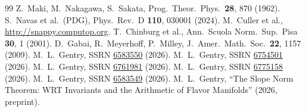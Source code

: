 \documentclass[11pt,a4paper]{article}
\theoremstyle{definition}
\begin{document}
\begin{thebibliography}{99}
Z.~Maki, M.~Nakagawa, S.~Sakata,
Prog.\ Theor.\ Phys.\ \textbf{28}, 870 (1962).
S.~Navas et al.\ (PDG), Phys.\ Rev.\ D \textbf{110}, 030001 (2024).
M.~Culler et al., \url{http://snappy.computop.org}.
T.~Chinburg et al.,
Ann.\ Scuola Norm.\ Sup.\ Pisa \textbf{30}, 1 (2001).
D.~Gabai, R.~Meyerhoff, P.~Milley,
J.\ Amer.\ Math.\ Soc.\ \textbf{22}, 1157 (2009).
M.~L.~Gentry, SSRN \href{https://doi.org/10.2139/ssrn.6583550}{6583550} (2026).
M.~L.~Gentry, SSRN \href{https://doi.org/10.2139/ssrn.6754501}{6754501} (2026).
M.~L.~Gentry, SSRN \href{https://doi.org/10.2139/ssrn.6761981}{6761981} (2026).
M.~L.~Gentry, SSRN \href{https://doi.org/10.2139/ssrn.6775158}{6775158} (2026).
M.~L.~Gentry, SSRN \href{https://doi.org/10.2139/ssrn.6583549}{6583549} (2026).
M.~L.~Gentry, ``The Slope Norm Theorem: WRT Invariants and the
Arithmetic of Flavor Manifolds'' (2026, preprint).
\end{thebibliography}
\end{document}

